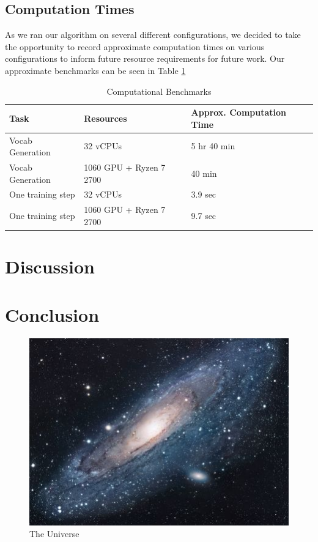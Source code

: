 \documentclass[11pt]{article}
\begin{document}
\subsection{Computation Times}

As we ran our algorithm on several different configurations, we decided to take the opportunity to record approximate computation times on various configurations to inform future resource requirements for future work. Our approximate benchmarks can be seen in Table \ref{table:2}

\begin{table}[h!]
\centering
\begin{tabular}{|p{2cm}|p{2cm}|p{1.5cm}|} 
 \hline
 Task & Resources & Approx. Computation Time \\ [0.5ex] 
 \hline
 Vocab Generation & 32 vCPUs & 5 hr 40 min \\ 
 Vocab Generation & 1060 GPU + Ryzen 7 2700 & 40 min \\
 One training step & 32 vCPUs & 3.9 sec \\
 One training step & 1060 GPU + Ryzen 7 2700 & 9.7 sec \\ [1ex]
 \hline
\end{tabular}
\caption{Computational Benchmarks}
\label{table:2}
\end{table}

\section{Discussion}
\section{Conclusion}

\begin{figure}[h!]
\centering
\includegraphics[scale=1.7]{universe}
\caption{The Universe}
\label{fig:universe}
\end{figure}
\end{document}

